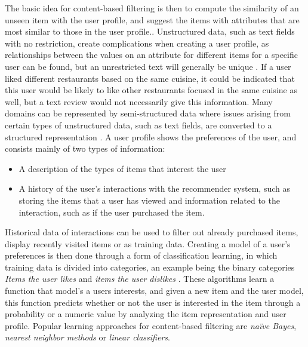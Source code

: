 \noindent
The basic idea for content-based filtering is then to compute the similarity of an unseen item with the user profile, and suggest the items with attributes that are most similar to those in the user profile..
Unstructured data, such as text fields with no restriction, create complications when creating a user profile, as relationships between the values on an attribute for different items for a specific user can be found, but an unrestricted text will generally be unique \cite{ContentBasedFiltering}. 
If a user liked different restaurants based on the same cuisine, it could be indicated that this user would be likely to like other restaurants focused in the same cuisine as well, but a text review would not necessarily give this information.
Many domains can be represented by semi-structured data where issues arising from certain types of unstructured data, such as text fields, are converted to a structured representation \cite{ContentBasedFiltering}.
A user profile shows the preferences of the user, and consists mainly of two types of information:
\begin{itemize}
    \item A description of the types of items that interest the user
    \item A history of the user's interactions with the recommender system, such as storing the items that a user has viewed and information related to the interaction, such as if the user purchased the item.
\end{itemize}
Historical data of interactions can be used to filter out already purchased items, display recently visited items or as training data.
Creating a model of a user's preferences is then done through a form of classification learning, in which training data is divided into categories, an example being the binary categories \textit{Items the user likes} and \textit{items the user dislikes} \cite{ContentBasedFiltering}.
These algorithms learn a function that model's a users interests, and given a new item and the user model, this function predicts whether or not the user is interested in the item through a probability or a numeric value by analyzing the item representation and user profile.
Popular learning approaches for content-based filtering are \textit{naïve Bayes}, \textit{nearest neighbor methods} or \textit{linear classifiers}.

